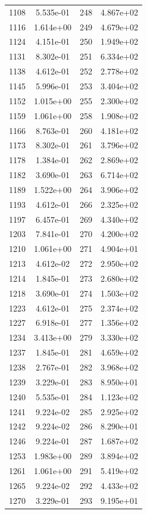 \documentclass[12pt]{article}
\begin{document}
\begin{longtable}{@{}cccc@{}}
1108 & 5.535e-01 & 248 & 4.867e+02 \\
1116 & 1.614e+00 & 249 & 4.679e+02 \\
1124 & 4.151e-01 & 250 & 1.949e+02 \\
1131 & 8.302e-01 & 251 & 6.334e+02 \\
1138 & 4.612e-01 & 252 & 2.778e+02 \\
1145 & 5.996e-01 & 253 & 3.404e+02 \\
1152 & 1.015e+00 & 255 & 2.300e+02 \\
1159 & 1.061e+00 & 258 & 1.908e+02 \\
1166 & 8.763e-01 & 260 & 4.181e+02 \\
1173 & 8.302e-01 & 261 & 3.796e+02 \\
1178 & 1.384e-01 & 262 & 2.869e+02 \\
1182 & 3.690e-01 & 263 & 6.714e+02 \\
1189 & 1.522e+00 & 264 & 3.906e+02 \\
1193 & 4.612e-01 & 266 & 2.325e+02 \\
1197 & 6.457e-01 & 269 & 4.340e+02 \\
1203 & 7.841e-01 & 270 & 4.200e+02 \\
1210 & 1.061e+00 & 271 & 4.904e+01 \\
1213 & 4.612e-02 & 272 & 2.950e+02 \\
1214 & 1.845e-01 & 273 & 2.680e+02 \\
1218 & 3.690e-01 & 274 & 1.503e+02 \\
1223 & 4.612e-01 & 275 & 2.374e+02 \\
1227 & 6.918e-01 & 277 & 1.356e+02 \\
1234 & 3.413e+00 & 279 & 3.330e+02 \\
1237 & 1.845e-01 & 281 & 4.659e+02 \\
1238 & 2.767e-01 & 282 & 3.968e+02 \\
1239 & 3.229e-01 & 283 & 8.950e+01 \\
1240 & 5.535e-01 & 284 & 1.123e+02 \\
1241 & 9.224e-02 & 285 & 2.925e+02 \\
1242 & 9.224e-02 & 286 & 8.290e+01 \\
1246 & 9.224e-01 & 287 & 1.687e+02 \\
1253 & 1.983e+00 & 289 & 3.894e+02 \\
1261 & 1.061e+00 & 291 & 5.419e+02 \\
1265 & 9.224e-02 & 292 & 4.433e+02 \\
1270 & 3.229e-01 & 293 & 9.195e+01 \\

\end{longtable}
\end{document}
